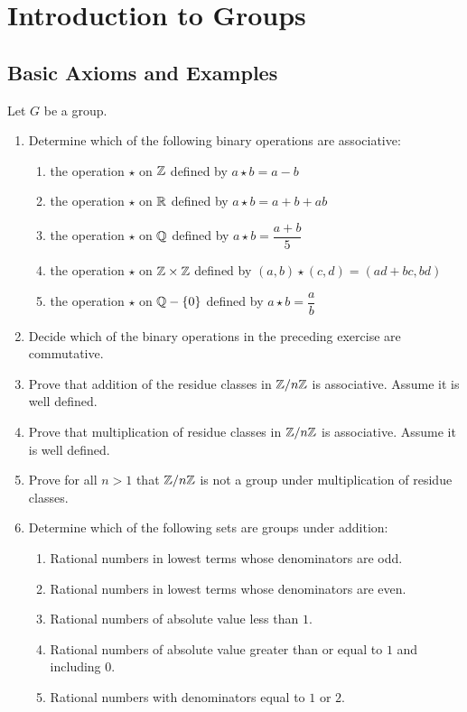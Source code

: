 \chapter{Introduction to Groups}
\section{Basic Axioms and Examples}
Let $G$ be a group.
	\begin{enumerate}
		\item Determine which of the following binary operations are associative:
		\begin{enumerate}
			\item the operation $\star$ on $\mathbb{Z}$ defined by $a\star b = a-b$
			\item the operation $\star$ on $\mathbb{R}$ defined by $a\star b =a+b+ab$
			\item the operation $\star$ on $\mathbb{Q}$ defined by $a\star b = \dfrac{a+b}{5}$
			\item the operation $\star$ on $\mathbb{Z}\times\mathbb{Z}$ defined by $(a,b)\star(c,d) = (ad+bc,bd)$
			\item the operation $\star$ on $\mathbb{Q}  - \left\{0\right\}$ defined by $a\star b =\dfrac{a}{b}$
		\end{enumerate}
		\item Decide which of the binary operations in the preceding exercise are commutative.
		\item Prove that addition of the residue classes in $\mathbb{Z}/n\mathbb{Z}$ is associative.  Assume it is well defined.
		\item Prove that multiplication of residue classes in $\mathbb{Z}/n\mathbb{Z}$ is associative.  Assume it is well defined.
		\item Prove for all $n>1$ that $\mathbb{Z}/n\mathbb{Z}$ is not a group under multiplication of residue classes.
		\item Determine which of the following sets are groups under addition:
		\begin{enumerate}
			\item Rational numbers in lowest terms whose denominators are odd.
			\item Rational numbers in lowest terms whose denominators are even.
			\item Rational numbers of absolute value less than $1$.
			\item Rational numbers of absolute value greater than or equal to $1$ and including $0$.
			\item Rational numbers with denominators equal to $1$ or $2$.

\end{enumerate}
\end{enumerate}
